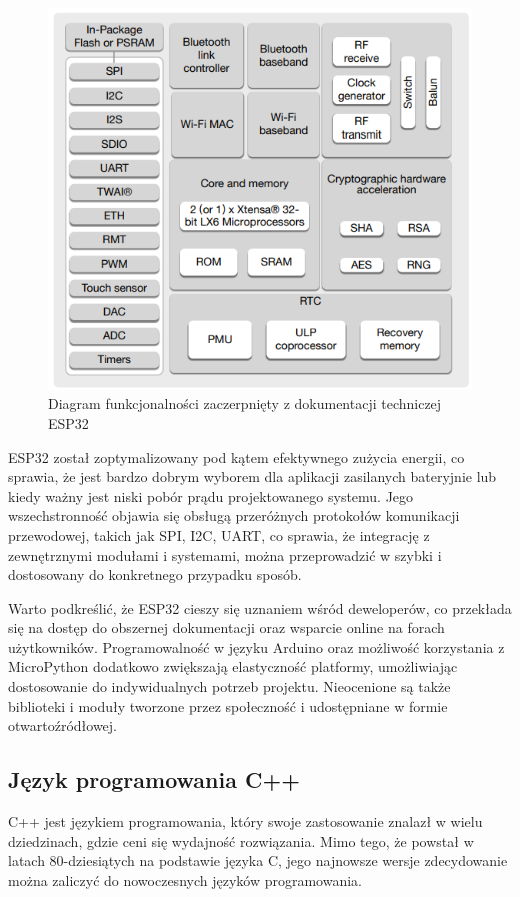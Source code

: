 \documentclass[12pt,twoside,draft]{article}
\begin{document}
\begin{figure}[ht]
   \centering
   \includegraphics[width=12cm]{images/esp32_functional_diagram.png}
   \caption{Diagram funkcjonalności zaczerpnięty z dokumentacji techniczej ESP32\cite{esp32Datasheet}}
   \label{Fig:functionalDiagram}
\end{figure}

ESP32 został zoptymalizowany pod kątem efektywnego zużycia energii, co sprawia, że jest bardzo dobrym
wyborem dla aplikacji zasilanych bateryjnie lub kiedy ważny jest niski pobór prądu projektowanego systemu. Jego wszechstronność objawia
się obsługą przeróżnych protokołów komunikacji przewodowej,
takich jak SPI, I2C, UART, co sprawia, że integrację z zewnętrznymi modułami i systemami, można przeprowadzić w szybki i dostosowany do konkretnego przypadku sposób.

Warto podkreślić, że ESP32 cieszy się uznaniem wśród deweloperów, co przekłada się na dostęp do obszernej dokumentacji oraz wsparcie online na forach użytkowników. Programowalność w języku Arduino oraz możliwość korzystania
z MicroPython dodatkowo zwiększają elastyczność platformy, umożliwiając dostosowanie do indywidualnych potrzeb projektu.
Nieocenione są także biblioteki i moduły tworzone przez społeczność i udostępniane w formie otwartoźródłowej.
\subsection{Język programowania C++}
C++ jest językiem programowania, który swoje zastosowanie znalazł w wielu dziedzinach, gdzie ceni się wydajność rozwiązania. Mimo tego, że powstał w latach 80-dziesiątych na podstawie języka C, jego najnowsze wersje zdecydowanie można zaliczyć do nowoczesnych języków programowania.
\end{document}
